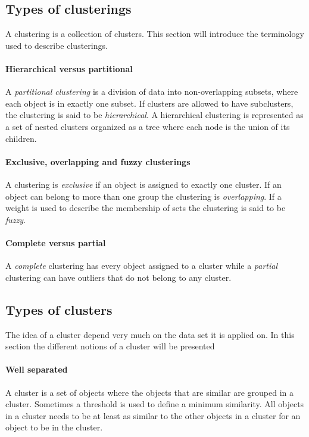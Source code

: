 \subsection{Types of clusterings}

A clustering is a collection of clusters.
This section will introduce the terminology used to describe clusterings. 

\paragraph{Hierarchical versus partitional}
A \textit{partitional clustering} is a division of data into non-overlapping subsets, where each object is in exactly one subset.
If clusters are allowed to have subclusters, the clustering is said to be \textit{hierarchical}.
A hierarchical clustering is represented as a set of nested clusters organized as a tree where each node is the union of its children.

\paragraph{Exclusive, overlapping and fuzzy clusterings}

A clustering is \textit{exclusive} if an object is assigned to exactly one cluster.
If an object can belong to more than one group the clustering is \textit{overlapping}.
If a weight is used to describe the membership of sets the clustering is said to be \textit{fuzzy}.

\paragraph{Complete versus partial}

A \textit{complete} clustering has every object assigned to a cluster while a \textit{partial} clustering can have outliers that do not belong to any cluster.

\subsection{Types of clusters}
The idea of a cluster depend very much on the data set it is applied on.
In this section the different notions of a cluster will be presented

\paragraph{Well separated}
A cluster is a set of objects where the objects that are similar are grouped in a cluster. 
Sometimes a threshold is used to define a minimum similarity. 
All objects in a cluster needs to be at least as similar to the other objects in a cluster for an object to be in the cluster.


